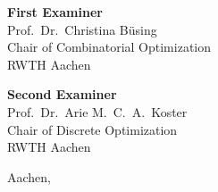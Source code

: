 \begin{titlepage}
\vspace{1.5cm}

\begin{minipage}[t]{0.45\textwidth}
    \centering
    {\large\bfseries First Examiner}\\[0.2cm]
    Prof.\ Dr.\ Christina Büsing\\[0.1cm]
    Chair of Combinatorial Optimization\\[0.1cm]
    RWTH Aachen
\end{minipage}%
\hfill
\begin{minipage}[t]{0.45\textwidth}
    \centering
    {\large\bfseries Second Examiner}\\[0.2cm]
    Prof.\ Dr.\ Arie M.\ C.\ A.\ Koster\\[0.1cm]
    Chair of Discrete Optimization\\[0.1cm]
    RWTH Aachen
\end{minipage}

\vfill

{\large Aachen, \thesisDate}

\end{titlepage}

\thispagestyle{empty}